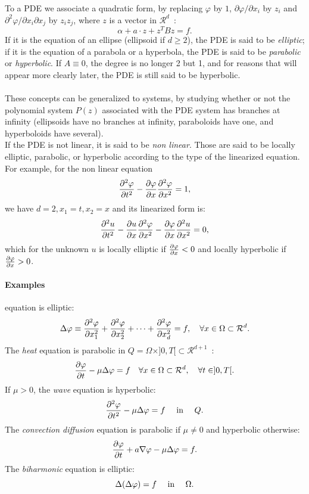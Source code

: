 \documentclass[a4paper,twoside,12pt]{book}
\def\p{\partial}
\def\Rel{{\mathcal R}}
\begin{document}
To a PDE we associate a quadratic form, by replacing
$\varphi$ by $1$,
$\p\varphi/\p x_i$ by $z_i$ and
$\p^2\varphi/\p x_i\p x_j$ by $z_i z_j$, where $z$
is a vector in $\Rel^d$~:
$$\alpha + a\cdot z + z^T Bz = f.
$$
If it is the equation of an ellipse (ellipsoid if $d \geq 2$),
the PDE is said to be {\it elliptic};
if it is the equation of a parabola or a hyperbola, the PDE is said to
be {\it parabolic} or {\it hyperbolic}. If $A \equiv 0$, the degree is
no longer 2 but 1, and for reasons that will appear more clearly
later, the PDE is still said to be hyperbolic.
\\\\
These concepts can be generalized to systems, by studying whether or
not the polynomial system $P(z)$ associated with the PDE system has
branches at infinity (ellipsoids have no branches at infinity,
paraboloids have one, and hyperboloids have several).
\\
If the PDE is not linear, it is said to be \emph{non linear}.
Those are said to be locally elliptic, parabolic, or hyperbolic
according to the type of the linearized equation.
\\
For example, for the non linear equation
 $${\p^2\varphi\over\p t^2} - {\p\varphi\over\p
 x}{\p^2\varphi\over\p x^2} = 1,
 $$
we have $d=2, x_1 = t, x_2 = x$ and its linearized form is:
 $${\p^2 u\over\p t^2} - {\p u\over\p x}
 {\p^2\varphi\over\p x^2} - {\p\varphi\over\p
 x}{\p^2 u\over\p x^2} = 0,
 $$
which for the unknown $u$ is locally elliptic if
${\p\varphi\over\p x} < 0$  and locally hyperbolic if
${\p\varphi\over\p x} > 0$.

\paragraph{Examples}

 equation is elliptic:
 $$\Delta\varphi \equiv {\p^2\varphi\over\p x^2_1} +
 {\p^2\varphi\over\p x^2_2} + \cdots +
 {\p^2\varphi\over\p x^2_d} = f, \ \ \ \forall x
 \in \Omega\subset \Rel^d.
 $$
The \emph{heat} equation is parabolic in
 $Q = \Omega\times]0,T[\subset \Rel^{d+1}$~:
 $${\p\varphi\over\p t} - \mu\Delta\varphi = f\quad\forall
 x\in\Omega\subset  \Rel^d, \quad\forall t\in]0,T[.
 $$
If $\mu >0$,  the \emph{wave} equation is hyperbolic:
 $${\p^2\varphi\over\p t^2} - \mu\Delta\varphi =
 f{\quad\hbox{~in~}\quad}  Q.
 $$
The \emph{convection diffusion} equation is parabolic if $\mu \neq 0$
and hyperbolic otherwise:
 $${\p\varphi\over\p t} + a\nabla\varphi -
 \mu\Delta\varphi = f.
 $$
The \emph{biharmonic} equation is elliptic:
 $$\Delta(\Delta\varphi) = f{\quad\hbox{~in~}\quad}\Omega.
 $$
\end{document}
